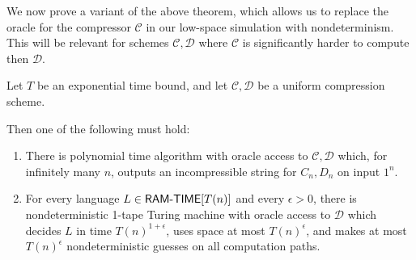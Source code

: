 We now prove a variant of the above theorem, which allows us to replace the oracle for the compressor $\mathcal{C}$ in our low-space simulation with nondeterminism. This will be relevant for schemes $\mathcal{C},\mathcal{D}$ where $\mathcal{C}$ is significantly harder to compute then $\mathcal{D}$.
\begin{theorem}\label{lossy:thm:swap-d-for-np}
Let $T$ be an exponential time bound, and let $\mathcal{C},\mathcal{D}$ be a uniform compression scheme.

Then one of the following must hold:
\begin{enumerate}
    \item There is polynomial time algorithm with oracle access to $\mathcal{C},\mathcal{D}$ which, for infinitely many $n$, outputs an incompressible string for $C_n,D_n$ on input $1^n$.
    \item For every language $L \in \cl{RAM\dash TIME}[T(n)]$ and every $\epsilon > 0$, there is nondeterministic 1-tape Turing machine with oracle access to $\mathcal{D}$ which decides $L$ in time $T(n)^{1+\epsilon}$, uses space at most $T(n)^{\epsilon}$, and makes at most $T(n)^{\epsilon}$ nondeterministic guesses on all computation paths.
\end{enumerate}
\end{theorem}
